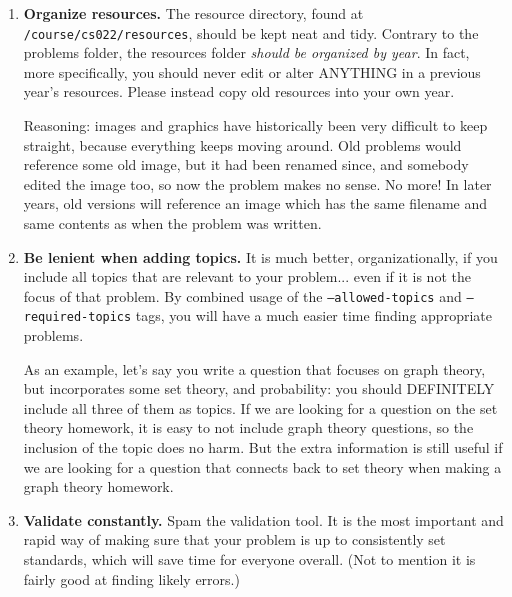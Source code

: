 {\begin{enumerate}
      Take advantage of \textit{private} assignments, which allow you to mark
      an assignment as a midterm/exam which did not have solutions released.
      The problems within it can be reused soon afterwards, and the finalize
      tool will mark the problems as used privately (allowing the build tool
      to not filted it out).
    \item \textbf{Organize resources.} The resource directory, found at
      \texttt{/course/cs022/resources}, should be kept neat and tidy.
      Contrary to the problems folder, the resources folder \textit{should
      be organized by year}. In fact, more specifically, you should never
      edit or alter ANYTHING in a previous year's resources. Please instead
      copy old resources into your own year.
      
      Reasoning: images and graphics have historically been very difficult to
      keep straight, because everything keeps moving around. Old problems
      would reference some old image, but it had been renamed since, and 
      somebody edited the image too, so now the problem makes no sense. No
      more! In later years, old versions will reference an image which
      has the same filename and same contents as when the problem was
      written.
    \item \textbf{Be lenient when adding topics.} It is much better,
      organizationally, if you include all topics that are relevant to your
      problem... even if it is not the focus of that problem. By combined
      usage of the \texttt{--allowed-topics} and \texttt{--required-topics}
      tags, you will have a much easier time finding appropriate problems.
      
      As an example, let's say you write a question that focuses on graph
      theory, but incorporates some set theory, and probability: you should
      DEFINITELY include all three of them as topics. If we are looking for a
      question on the set theory homework, it is easy to not include graph
      theory questions, so the inclusion of the topic does no harm. But the
      extra information is still useful if we are looking for a question that
      connects back to set theory when making a graph theory homework.
    \item \textbf{Validate constantly.} Spam the validation tool. It is the
      most important and rapid way of making sure that your problem is up to
      consistently set 
      standards, which will save time for everyone overall. (Not to mention it
      is fairly good at finding likely errors.)
  \end{enumerate}

}
